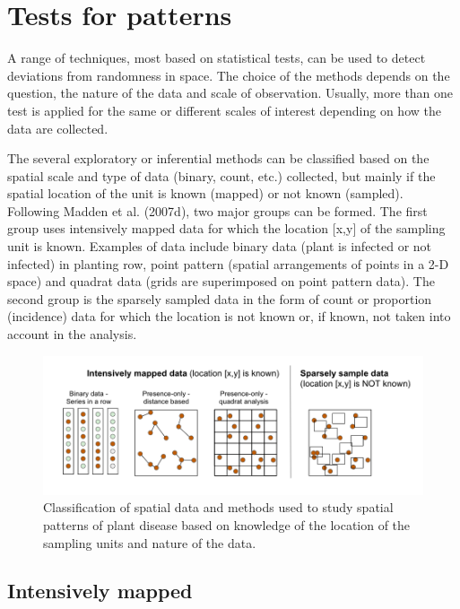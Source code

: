 \documentclass[
  letterpaper,
]{book}
\begin{document}
\hypertarget{tests-for-patterns}{%
\chapter{Tests for patterns}\label{tests-for-patterns}}

A range of techniques, most based on statistical tests, can be used to
detect deviations from randomness in space. The choice of the methods
depends on the question, the nature of the data and scale of
observation. Usually, more than one test is applied for the same or
different scales of interest depending on how the data are collected.

The several exploratory or inferential methods can be classified based
on the spatial scale and type of data (binary, count, etc.) collected,
but mainly if the spatial location of the unit is known (mapped) or not
known (sampled). Following Madden et al. (2007d), two major groups can
be formed. The first group uses intensively mapped data for which the
location {[}x,y{]} of the sampling unit is known. Examples of data
include binary data (plant is infected or not infected) in planting row,
point pattern (spatial arrangements of points in a 2-D space) and
quadrat data (grids are superimposed on point pattern data). The second
group is the sparsely sampled data in the form of count or proportion
(incidence) data for which the location is not known or, if known, not
taken into account in the analysis.

\begin{figure}

\includegraphics{imgs/spatial_methods.png} \hfill{}

\caption{\label{fig-spatialmethods}Classification of spatial data and
methods used to study spatial patterns of plant disease based on
knowledge of the location of the sampling units and nature of the data.}

\end{figure}

\hypertarget{intensively-mapped}{%
\section{Intensively mapped}\label{intensively-mapped}}
\end{document}
